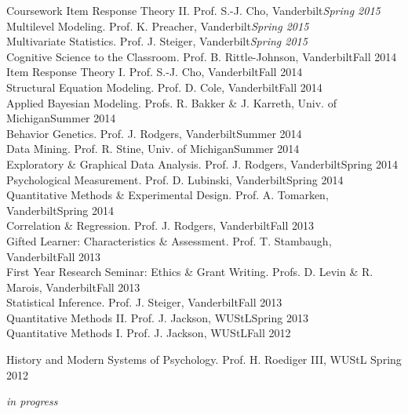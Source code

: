 \documentclass {resume}
\begin{document}
\begin{rSection}{\textrm{Coursework}}
Item Response Theory \textrm{II}. Prof. S.-J. Cho, Vanderbilt\hfill  {\textit{Spring 2015}}\smallskip\\
Multilevel Modeling. Prof. K. Preacher, Vanderbilt\hfill  {\textit{Spring 2015}}\smallskip\\
Multivariate Statistics. Prof. J. Steiger, Vanderbilt\hfill  {\textit{Spring 2015}}\smallskip\\
Cognitive Science to the Classroom. Prof. B. Rittle-Johnson, Vanderbilt\hfill  {Fall 2014}\smallskip\\
Item Response Theory \textrm{I}. Prof. S.-J. Cho, Vanderbilt\hfill  {Fall 2014}\smallskip\\
Structural Equation Modeling. Prof. D. Cole, Vanderbilt\hfill  {Fall 2014}\smallskip\\%
Applied Bayesian Modeling. Profs. R. Bakker \& J. Karreth, Univ. of Michigan\hfill  {Summer 2014}\smallskip\\
Behavior Genetics. Prof. J. Rodgers, Vanderbilt\hfill  {Summer 2014}\smallskip\\
Data Mining. Prof. R. Stine, Univ. of Michigan\hfill  {Summer 2014}\smallskip\\
Exploratory \& Graphical Data Analysis. Prof. J. Rodgers, Vanderbilt\hfill  {Spring 2014}\smallskip\\
Psychological Measurement. Prof. D. Lubinski, Vanderbilt\hfill  {Spring 2014}\smallskip\\
Quantitative Methods \& Experimental Design. Prof. A. Tomarken, Vanderbilt\hfill  {Spring 2014}\smallskip\\
Correlation \& Regression. Prof. J. Rodgers, Vanderbilt\hfill  {Fall 2013}\smallskip\\
Gifted Learner: Characteristics \& Assessment. Prof. T. Stambaugh, Vanderbilt\hfill  {Fall 2013}\smallskip\\
First Year Research Seminar: Ethics \& Grant Writing. Profs. D. Levin \& R. Marois, Vanderbilt\hfill  {Fall 2013}\smallskip\\
Statistical Inference. Prof. J. Steiger, Vanderbilt\hfill  {Fall 2013}\smallskip\\
Quantitative Methods \textrm{II}. Prof. J. Jackson, WUStL\hfill  {Spring 2013}\smallskip\\
Quantitative Methods \textrm{I}. Prof. J. Jackson, WUStL\hfill  {Fall 2012}\smallskip\\
\begin{samepage}History and Modern Systems of Psychology. Prof. H. Roediger \textrm{III}, WUStL \hfill  {Spring 2012}\vspace{-2mm}\begin{center}\footnotesize{ %
\textit{in progress}
}\end{center} \vspace{-4mm}\end{samepage}
\end{rSection}
\end{document}
